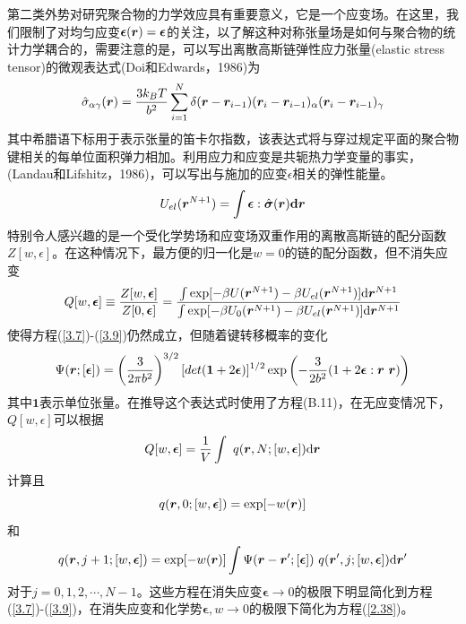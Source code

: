 第二类外势对研究聚合物的力学效应具有重要意义，它是一个应变场。在这里，我们限制了对均匀应变$\boldsymbol{\epsilon}(\bm{r})=\boldsymbol{\epsilon}$的关注，以了解这种对称张量场是如何与聚合物的统计力学耦合的，需要注意的是，可以写出离散高斯链弹性应力张量(elastic stress tensor)的微观表达式(Doi和Edwards，1986)为
\begin{equation}\label{3.11}
\hat{\sigma}_{\alpha\gamma}(\bm{r})=\frac{3k_BT}{b^2}\sum\limits_{i=1}^N\delta(\bm{r}-\bm{r}_{i-1})(\bm{r}_{i}-\bm{r}_{i-1})_{\alpha}(\bm{r}_i-\bm{r}_{i-1})_{\gamma}
\end{equation}
其中希腊语下标用于表示张量的笛卡尔指数，该表达式将与穿过规定平面的聚合物键相关的每单位面积弹力相加。利用应力和应变是共轭热力学变量的事实，(Landau和Lifshitz，1986)，可以写出与施加的应变$\epsilon$相关的弹性能量。
\begin{equation}\label{3.12}
U_{el}(\bm{r}^{N+1})=\int\boldsymbol{\epsilon}:\hat{\boldsymbol{\sigma}}(\bm{r})\mathbf{d}\bm{r}
\end{equation}
特别令人感兴趣的是一个受化学势场和应变场双重作用的离散高斯链的配分函数$Z[w,\epsilon]$。在这种情况下，最方便的归一化是$w=0$的链的配分函数，但不消失应变
\begin{equation}\label{3.13}
Q[w,\boldsymbol{\epsilon}]\equiv\frac{Z[w,\boldsymbol{\epsilon}]}{Z[0,\boldsymbol{\epsilon}]}=\frac{\int\exp[-\beta U(\bm{r}^{N+1})-\beta U_{el}(\bm{r}^{N+1})]\mathrm{d}\bm{r}^{N+1}}{\int\exp[-\beta U_0(\bm{r}^{N+1})-\beta U_{el}(\bm{r}^{N+1})]\mathrm{d}\bm{r}^{N+1}}
\end{equation}
使得方程(\ref{3.7})-(\ref{3.9})仍然成立，但随着键转移概率的变化
\begin{equation}\label{3.14}
\Psi(\bm{r};[\boldsymbol{\epsilon}])=\left(\frac{3}{2\pi b^2}\right)^{3/2}[det(\boldsymbol{1}+2\boldsymbol{\epsilon})]^{1/2}\exp\left(-\frac{3}{2b^2}(1+2\boldsymbol{\epsilon}:\bm{r}~\bm{r})\right)
\end{equation}
其中$\boldsymbol{1}$表示单位张量。在推导这个表达式时使用了方程(B.11)，在无应变情况下，$Q[w,\epsilon]$可以根据
\begin{equation}\label{3.15}
Q[w,\boldsymbol{\epsilon}]=\frac{1}{V}\int~q(\bm{r},N;[w,\boldsymbol{\epsilon}])\mathrm{d}\bm{r}
\end{equation}
计算且
\begin{equation}\label{3.16}
q(\bm{r},0;[w,\boldsymbol{\epsilon}])=\exp[-w(\bm{r})]
\end{equation}
和
\begin{equation}\label{3.17}
q(\bm{r},j+1;[w,\boldsymbol{\epsilon}])=\exp[-w(\bm{r})]\int\Psi(\bm{r}-\bm{r}';[\boldsymbol{\epsilon}])~q(\bm{r}',j;[w,\boldsymbol{\epsilon}])\mathrm{d}\bm{r}'
\end{equation}
对于$j=0,1,2,\cdots,N-1$。这些方程在消失应变$\boldsymbol{\epsilon}\rightarrow 0$的极限下明显简化到方程(\ref{3.7})-(\ref{3.9})，在消失应变和化学势$\boldsymbol{\epsilon},w\rightarrow 0$的极限下简化为方程(\ref{2.38})。
